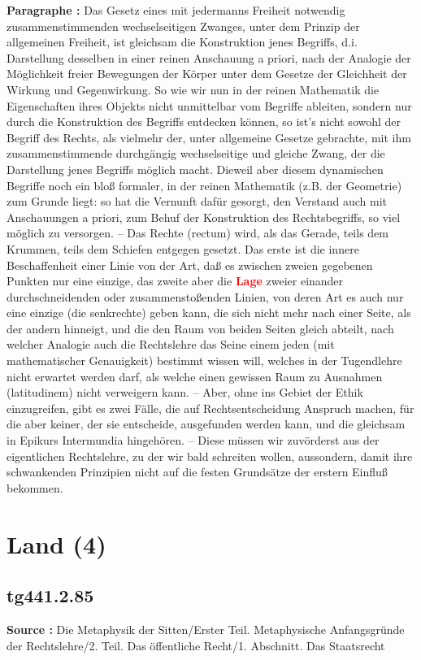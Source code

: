 \documentclass[a4paper,12pt,twoside]{book}
\newcommand{\match}[1]{\textcolor{red}{\textbf{#1}}}
\newcommand{\unnumberedsection}[1]{
	\section*{#1}
	\addcontentsline{toc}{section}{#1}
	\markright{#1}
}
\begin{document}
	\textbf{Paragraphe : }Das Gesetz eines mit jedermanns Freiheit notwendig zusammenstimmenden wechselseitigen Zwanges, unter dem Prinzip der allgemeinen Freiheit, ist gleichsam die Konstruktion jenes Begriffs, d.i. Darstellung desselben in einer reinen Anschauung a priori, nach der Analogie der Möglichkeit freier Bewegungen der Körper unter dem Gesetze der Gleichheit der Wirkung und Gegenwirkung. So wie wir nun in der reinen Mathematik die Eigenschaften ihres Objekts nicht unmittelbar vom Begriffe ableiten, sondern nur durch die Konstruktion des Begriffs entdecken können, so ist's nicht sowohl der Begriff des Rechts, als vielmehr der, unter allgemeine Gesetze gebrachte, mit ihm zusammenstimmende durchgängig wechselseitige und gleiche Zwang, der die Darstellung jenes Begriffs möglich macht. Dieweil aber diesem dynamischen Begriffe noch ein bloß formaler, in der reinen Mathematik (z.B. der Geometrie) zum Grunde liegt: so hat die Vernunft dafür gesorgt, den Verstand auch mit Anschauungen a priori, zum Behuf der Konstruktion des Rechtsbegriffs, so viel möglich zu versorgen. – Das Rechte (rectum) wird, als das Gerade, teils dem Krummen, teils dem Schiefen entgegen gesetzt. Das erste ist die innere Beschaffenheit einer Linie von der Art, daß es zwischen zweien gegebenen Punkten nur eine einzige, das zweite aber die \match{Lage} zweier einander durchschneidenden oder zusammenstoßenden Linien, von deren Art es auch nur eine einzige (die senkrechte) geben kann, die sich nicht mehr nach einer Seite, als der andern hinneigt, und die den Raum von beiden Seiten gleich abteilt, nach welcher Analogie auch die Rechtslehre das Seine einem jeden (mit mathematischer Genauigkeit) bestimmt wissen will, welches in der Tugendlehre nicht erwartet werden darf, als welche einen gewissen Raum zu Ausnahmen (latitudinem) nicht verweigern kann. – Aber, ohne ins Gebiet der Ethik einzugreifen, gibt es zwei Fälle, die auf Rechtsentscheidung  Anspruch machen, für die aber keiner, der sie entscheide, ausgefunden werden kann, und die gleichsam in Epikurs Intermundia hingehören. – Diese müssen wir zuvörderst aus der eigentlichen Rechtslehre, zu der wir bald schreiten wollen, aussondern, damit ihre schwankenden Prinzipien nicht auf die festen Grundsätze der erstern Einfluß bekommen. 
	
	\unnumberedsection{Land (4)} 
	\subsection*{tg441.2.85} 
	\textbf{Source : }Die Metaphysik der Sitten/Erster Teil. Metaphysische Anfangsgründe der Rechtslehre/2. Teil. Das öffentliche Recht/1. Abschnitt. Das Staatsrecht\\  
	
\end{document}
